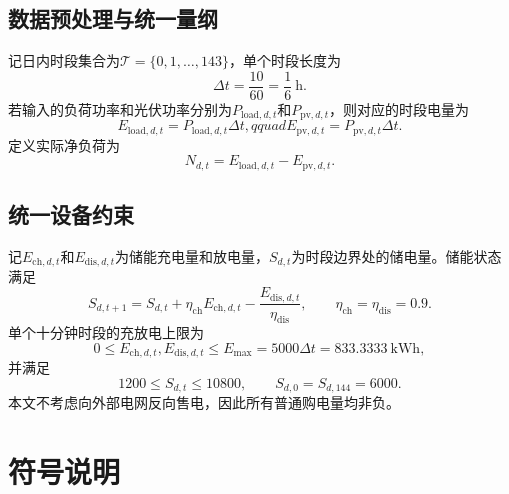 \documentclass{cumcmthesis}
\newcommand{\kwh}{\mathrm{kWh}}
\newcommand{\Tset}{\mathcal{T}}
\begin{document}
\subsection{数据预处理与统一量纲}

记日内时段集合为$\Tset=\{0,1,\ldots,143\}$，单个时段长度为
\begin{equation}
    \Delta t=\frac{10}{60}=\frac{1}{6}\ \mathrm{h}.
    \tag{1}
\end{equation}
若输入的负荷功率和光伏功率分别为$P_{\mathrm{load},d,t}$和$P_{\mathrm{pv},d,t}$，则对应的时段电量为
\begin{equation}
    E_{\mathrm{load},d,t}=P_{\mathrm{load},d,t}\Delta t,qquad
    E_{\mathrm{pv},d,t}=P_{\mathrm{pv},d,t}\Delta t.
    \tag{2}
\end{equation}
定义实际净负荷为
\begin{equation}
    N_{d,t}=E_{\mathrm{load},d,t}-E_{\mathrm{pv},d,t}.
    \tag{3}
\end{equation}

\subsection{统一设备约束}

记$E_{\mathrm{ch},d,t}$和$E_{\mathrm{dis},d,t}$为储能充电量和放电量，$S_{d,t}$为时段边界处的储电量。储能状态满足
\begin{equation}
S_{d,t+1}=S_{d,t}+\eta_{\mathrm{ch}}E_{\mathrm{ch},d,t}
-\frac{E_{\mathrm{dis},d,t}}{\eta_{\mathrm{dis}}},
\qquad \eta_{\mathrm{ch}}=\eta_{\mathrm{dis}}=0.9.
\tag{4}
\end{equation}
单个十分钟时段的充放电上限为
\begin{equation}
0\leq E_{\mathrm{ch},d,t},E_{\mathrm{dis},d,t}
\leq E_{\max}=5000\Delta t=833.3333\ \kwh,
\tag{5}
\end{equation}
并满足
\begin{equation}
1200\leq S_{d,t}\leq10800,\qquad S_{d,0}=S_{d,144}=6000.
\tag{6}
\end{equation}
本文不考虑向外部电网反向售电，因此所有普通购电量均非负。

\section{符号说明}
\end{document}
